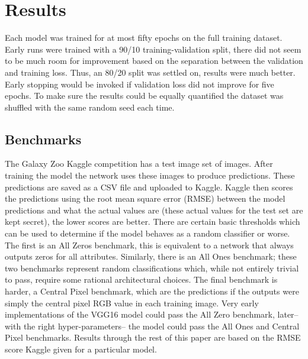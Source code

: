 \section{Results}



Each model was trained for at most fifty epochs on the full training dataset. Early runs were trained with a 90/10 training-validation split, there did not seem to be much room for improvement based on the separation between the validation and training loss. Thus, an 80/20 split was settled on, results were much better. Early stopping would be invoked if validation loss did not improve for five epochs. To make sure the results could be equally quantified the dataset was shuffled with the same random seed each time.

\subsection{Benchmarks}\label{benchmarks}
The Galaxy Zoo Kaggle competition has a test image set of  images. After training the model the network uses these images to produce predictions. These predictions are saved as a CSV file and uploaded to Kaggle. Kaggle then scores the predictions using the root mean square error (RMSE) between the model predictions and what the actual values are (these actual values for the test set are kept secret), the lower scores are better. There are certain basic thresholds which can be used to determine if the model behaves as a random classifier or worse. The first is an All Zeros benchmark, this is equivalent to a network that always outputs zeros for all attributes. Similarly, there is an All Ones benchmark; these two benchmarks represent random classifications which, while not entirely trivial to pass, require some rational architectural choices. The final benchmark is harder, a Central Pixel benchmark, which are the predictions if the outputs were simply the central pixel RGB value in each training image. Very early implementations of the VGG16 model could pass the All Zero benchmark, later--with the right hyper-parameters-- the model could pass the All Ones and Central Pixel benchmarks. Results through the rest of this paper are based on the RMSE score Kaggle given for a particular model.

